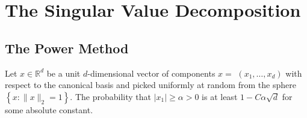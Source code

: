 \documentclass[a4paper, english, headtopline=0.08em, headsepline=0.04em, left = 1cm, right = 1cm, DIV=15]{article}
\begin{document}
\section{The Singular Value Decomposition}

\subsection{The Power Method}
\begin{lemma}
Let $x \in \mathbb{R}^{d}$ be a unit $d$-dimensional vector of components $x=$ $\left(x_{1}, \ldots, x_{d}\right)$ with respect to the canonical basis and picked uniformly at random from the sphere $\left\{x:\|x\|_{2}=1\right\}$. The probability that $\left|x_{1}\right| \geq \alpha>0$ is at least $1-C \alpha \sqrt{d}$ for some absolute constant.
\end{lemma}
\end{document}
